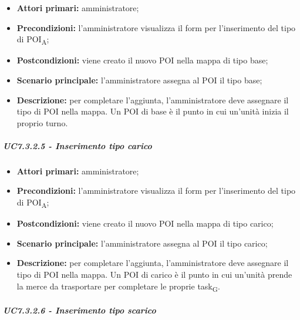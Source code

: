 \begin{itemize}

   \item   \textbf{Attori primari:} amministratore;

   \item   \textbf{Precondizioni:} l'amministratore visualizza il form per l'inserimento del tipo di POI\textsubscript{A};

   \item   \textbf{Postcondizioni:} viene creato il nuovo POI nella mappa di tipo base; 

   \item   \textbf{Scenario principale:} l'amministratore assegna al POI il tipo base;

   \item   \textbf{Descrizione:} per completare l'aggiunta, l'amministratore deve assegnare il tipo di POI nella mappa. Un POI di base è il punto in cui un'unità inizia il proprio turno.



\end{itemize}



\subparagraph{UC7.3.2.5 - Inserimento tipo carico}

\begin{itemize}

   \item   \textbf{Attori primari:} amministratore;

   \item   \textbf{Precondizioni:} l'amministratore visualizza il form per l'inserimento del tipo di POI\textsubscript{A};

   \item   \textbf{Postcondizioni:} viene creato il nuovo POI nella mappa di tipo carico; 

 \item   \textbf{Scenario principale:} l'amministratore assegna al POI il tipo carico;

   \item   \textbf{Descrizione:} per completare l'aggiunta, l'amministratore deve assegnare il tipo di POI nella mappa. Un POI di carico è il punto in cui un'unità prende la merce da trasportare per completare le proprie task\textsubscript{G}.



\end{itemize}



\subparagraph{UC7.3.2.6 - Inserimento tipo scarico}

